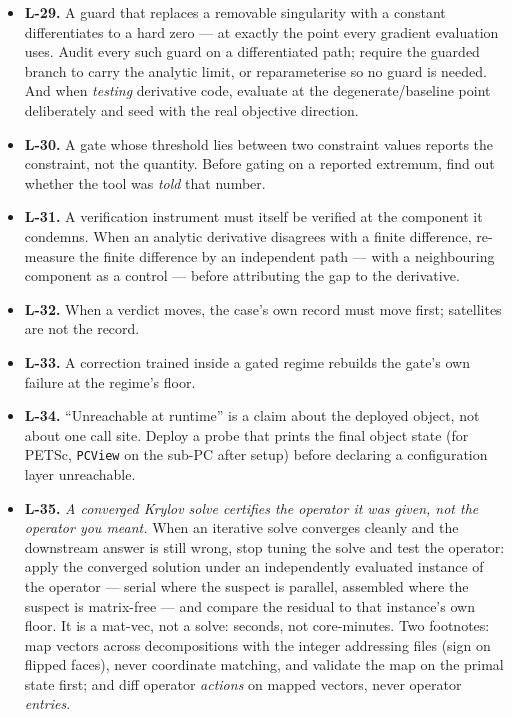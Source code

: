 \documentclass[11pt,a4paper]{article}
\begin{document}
\begin{itemize}
\item \textbf{L-29.} A guard that replaces a removable singularity with a constant
differentiates to a hard zero --- at exactly the point every gradient evaluation uses. Audit
every such guard on a differentiated path; require the guarded branch to carry the analytic
limit, or reparameterise so no guard is needed. And when \emph{testing} derivative code,
evaluate at the degenerate/baseline point deliberately and seed with the real objective
direction.
\item \textbf{L-30.} A gate whose threshold lies between two constraint values reports the
constraint, not the quantity. Before gating on a reported extremum, find out whether the tool
was \emph{told} that number.
\item \textbf{L-31.} A verification instrument must itself be verified at the component it
condemns. When an analytic derivative disagrees with a finite difference, re-measure the
finite difference by an independent path --- with a neighbouring component as a control ---
before attributing the gap to the derivative.
\item \textbf{L-32.} When a verdict moves, the case's own record must move first; satellites
are not the record.
\item \textbf{L-33.} A correction trained inside a gated regime rebuilds the gate's own
failure at the regime's floor.
\item \textbf{L-34.} ``Unreachable at runtime'' is a claim about the deployed object, not
about one call site. Deploy a probe that prints the final object state (for PETSc,
\texttt{PCView} on the sub-PC after setup) before declaring a configuration layer unreachable.
\item \textbf{L-35.} \emph{A converged Krylov solve certifies the operator it was given, not
the operator you meant.} When an iterative solve converges cleanly and the downstream answer
is still wrong, stop tuning the solve and test the operator: apply the converged solution
under an independently evaluated instance of the operator --- serial where the suspect is
parallel, assembled where the suspect is matrix-free --- and compare the residual to that
instance's own floor. It is a mat-vec, not a solve: seconds, not core-minutes. Two footnotes:
map vectors across decompositions with the integer addressing files (sign on flipped faces),
never coordinate matching, and validate the map on the primal state first; and diff operator
\emph{actions} on mapped vectors, never operator \emph{entries}.

\end{itemize}
\end{document}
